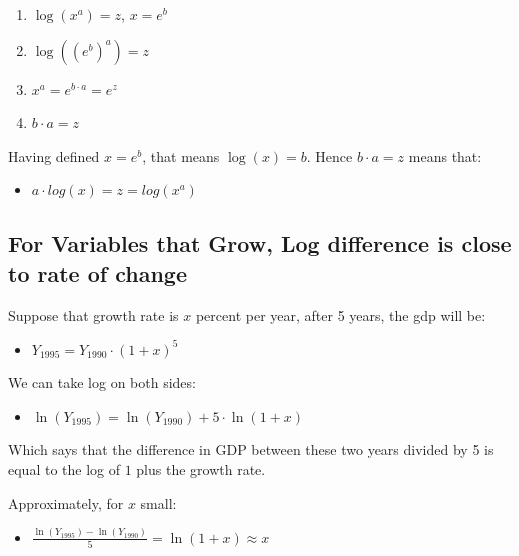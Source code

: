 \documentclass[
]{book}
\providecommand{\tightlist}{%
  \setlength{\itemsep}{0pt}\setlength{\parskip}{0pt}}
\begin{document}
\begin{enumerate}
\def\labelenumi{\arabic{enumi}.}
\item
  \(\log (x^a )=z\), \(x=e^b\)
\item
  \(\displaystyle \log \left({\left(e^b \right)}^a \right)=z\)
\item
  \(\displaystyle x^a =e^{b\cdot a} =e^z\)
\item
  \(\displaystyle b\cdot a=z\)
\end{enumerate}

Having defined \(x=e^b\), that means \(\log (x)=b\). Hence \(b\cdot a=z\)
means that:

\begin{itemize}
\tightlist
\item
  \(\displaystyle a\cdot log(x)=z=log(x^a )\)
\end{itemize}

\hypertarget{for-variables-that-grow-log-difference-is-close-to-rate-of-change}{%
\subsection{For Variables that Grow, Log difference is close to rate of change}\label{for-variables-that-grow-log-difference-is-close-to-rate-of-change}}

Suppose that growth rate is \(x\) percent per year, after 5 years, the gdp
will be:

\begin{itemize}
\tightlist
\item
  \(\displaystyle Y_{1995} =Y_{1990} \cdot (1+x)^5\)
\end{itemize}

We can take log on both sides:

\begin{itemize}
\tightlist
\item
  \(\displaystyle \ln (Y_{1995} )=\ln (Y_{1990} )+5\cdot \ln (1+x)\)
\end{itemize}

Which says that the difference in GDP between these two years divided by
5 is equal to the log of \(1\) plus the growth rate.

Approximately, for \(x\) small:

\begin{itemize}
\tightlist
\item
  \(\displaystyle \frac{\ln (Y_{1995} )-\ln (Y_{1990} )}{5}=\ln (1+x)\approx x\)
\end{itemize}
\end{document}
